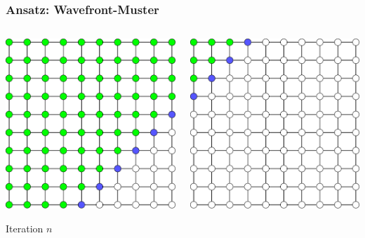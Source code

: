 \documentclass{beamer}
\begin{document}
\begin{frame}
    \frametitle{Ansatz: Wavefront-Muster}
    \begin{columns}
        \begin{column}{0.5\textwidth}
            \includegraphics[width=\textwidth]{wavefront1}
            \begin{center}
                Iteration $n$
            \end{center}
        \end{column}
        \begin{column}{0.5\textwidth}
            \includegraphics[width=\textwidth]{wavefront2}

\end{column}
\end{columns}
\end{frame}
\end{document}

